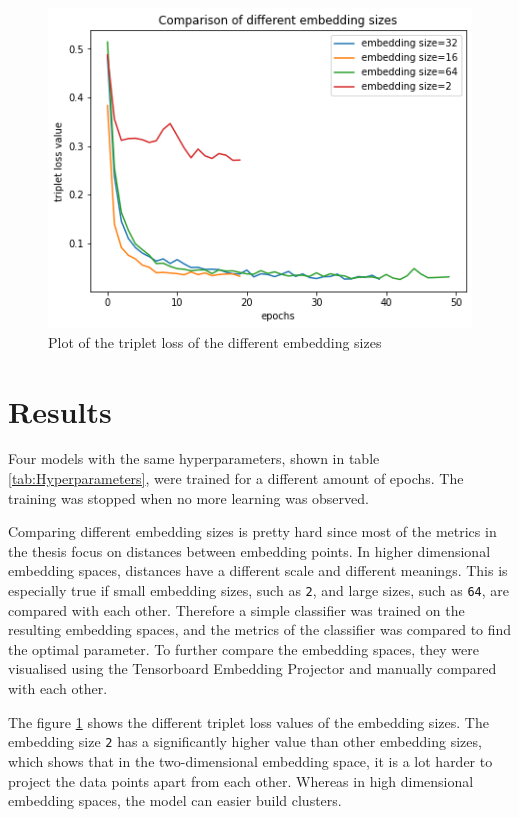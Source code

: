 \documentclass[twocolumn]{article}
\begin{document}
\begin{figure}[t]
\centering
    \includegraphics[width=\linewidth]{assets/plot_embedding_sizes.png}
    \caption{Plot of the triplet loss of the different embedding sizes}
    \label{fig:plot-embeddings-epochs}
\end{figure}

\section{Results}
Four models with the same hyperparameters, shown in table \ref{tab:Hyperparameters}, were trained for a different amount of epochs. The training was stopped when no more learning was observed. 

Comparing different embedding sizes is pretty hard since most of the metrics in the thesis focus on distances between embedding points. In higher dimensional embedding spaces, distances have a different scale and different meanings. This is especially true if small embedding sizes, such as \texttt{2}, and large sizes, such as \texttt{64}, are compared with each other. Therefore a simple classifier was trained on the resulting embedding spaces, and the metrics of the classifier was compared to find the optimal parameter. To further compare the embedding spaces, they were visualised using the Tensorboard Embedding Projector and manually compared with each other.

The figure \ref{fig:plot-embeddings-epochs} shows the different triplet loss values of the embedding sizes. The embedding size \texttt{2} has a significantly higher value than other embedding sizes, which shows that in the two-dimensional embedding space, it is a lot harder to project the data points apart from each other. Whereas in high dimensional embedding spaces, the model can easier build clusters.  
\end{document}
